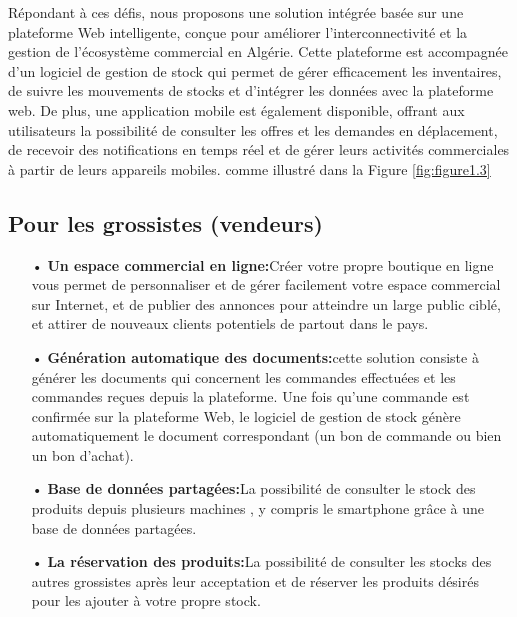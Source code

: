 \documentclass[edit,12pt,a4paper,ChapStyle,oneside,doubleinterligne]{report}
\begin{document}
Répondant à ces défis, nous proposons une solution intégrée basée sur une plateforme Web intelligente, conçue pour améliorer l'interconnectivité et la gestion de l'écosystème commercial en Algérie. Cette plateforme est accompagnée d'un logiciel de gestion de stock qui permet de gérer efficacement les inventaires, de suivre les mouvements de stocks et d'intégrer les données avec la plateforme web. De plus, une application mobile est également disponible, offrant aux utilisateurs la possibilité de consulter les offres et les demandes en déplacement, de recevoir des notifications en temps réel et de gérer leurs activités commerciales à partir de leurs appareils mobiles.
comme illustré dans la Figure \ref{fig:figure1.3}
\subsection{Pour les grossistes (vendeurs)}
\begin{itemize}
    \item [•] \textbf{Un espace commercial en ligne:}Créer votre propre boutique en ligne vous permet de personnaliser et de gérer facilement votre espace commercial sur Internet, et de publier des annonces pour atteindre un large public ciblé, et attirer de nouveaux clients potentiels de partout dans le pays.
    \item [•] \textbf{Génération automatique des documents:}cette solution consiste à générer les documents qui concernent les commandes effectuées et les commandes reçues depuis la plateforme. Une fois qu'une commande est confirmée sur la plateforme Web, le logiciel de gestion de stock génère automatiquement le document correspondant (un bon de commande ou bien un bon d’achat).
    \item [•] \textbf{Base de données partagées:}La possibilité de consulter le stock des produits depuis plusieurs machines ,  y compris le smartphone grâce à une base de données partagées.
    \item [•] \textbf{La réservation des produits:}La possibilité de consulter les stocks des autres grossistes après leur acceptation et de réserver les produits désirés pour les ajouter à votre propre stock.
\end{itemize}
\end{document}
